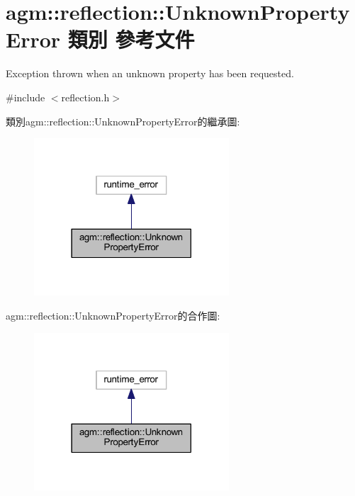 \hypertarget{classagm_1_1reflection_1_1_unknown_property_error}{}\section{agm\+:\+:reflection\+:\+:Unknown\+Property\+Error 類別 參考文件}
\label{classagm_1_1reflection_1_1_unknown_property_error}


Exception thrown when an unknown property has been requested.  




{\ttfamily \#include $<$reflection.\+h$>$}



類別agm\+:\+:reflection\+:\+:Unknown\+Property\+Error的繼承圖\+:\nopagebreak
\begin{figure}[H]
\begin{center}
\leavevmode
\includegraphics[width=206pt]{classagm_1_1reflection_1_1_unknown_property_error__inherit__graph}
\end{center}
\end{figure}


agm\+:\+:reflection\+:\+:Unknown\+Property\+Error的合作圖\+:\nopagebreak
\begin{figure}[H]
\begin{center}
\leavevmode
\includegraphics[width=206pt]{classagm_1_1reflection_1_1_unknown_property_error__coll__graph}
\end{center}
\end{figure}
